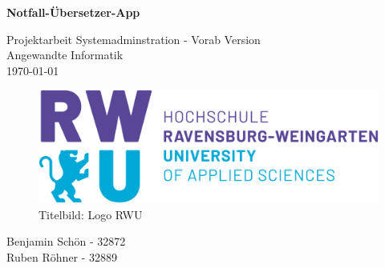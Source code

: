 \begin{titlepage}
    \begin{center}
        \begin{LARGE}		
            \bf{Notfall-Übersetzer-App\\}
		\end{LARGE}
		\vspace{20pt}
		\begin{LARGE}
		    Projektarbeit Systemadminstration - Vorab Version\\
            Angewandte Informatik\\
            \today\\
		\end{LARGE}
		\vspace{40pt}
		\begin{figure}[h]
            \includegraphics[width=1\textwidth, center]{resources/titleImage_rwu.png}
            \caption[Titelbild: Logo RWU]{Titelbild: Logo RWU}
        \end{figure}
        \vspace{10pt}
		\begin{LARGE}
		    Benjamin Schön - 32872\\
            Ruben Röhner - 32889\\
		    \vspace{7pt}
		\end{LARGE}
    \end{center} 
\end{titlepage}
